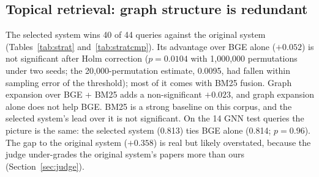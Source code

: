 \documentclass[conference]{IEEEtran}
\begin{document}
\begin{table}[t]
\centering
\caption{NDCG@10 on public benchmarks, alone and fused with BM25}
\label{tab:public}
\end{table}

\subsection{Topical retrieval: graph structure is redundant}
\label{sec:topical}

The selected system wins 40 of 44 queries against the original system (Tables~\ref{tab:strat} and~\ref{tab:stratcmp}). Its advantage over BGE alone ($+0.052$) is not significant after Holm correction ($p = 0.0104$ with 1,000,000 permutations under two seeds; the 20,000-permutation estimate, 0.0095, had fallen within sampling error of the threshold); most of it comes with BM25 fusion. Graph expansion over BGE + BM25 adds a non-significant $+0.023$, and graph expansion alone does not help BGE. BM25 is a strong baseline on this corpus, and the selected system's lead over it is not significant. On the 14 GNN test queries the picture is the same: the selected system (0.813) ties BGE alone (0.814; $p = 0.96$). The gap to the original system ($+0.358$) is real but likely overstated, because the judge under-grades the original system's papers more than ours (Section~\ref{sec:judge}).
\end{document}
